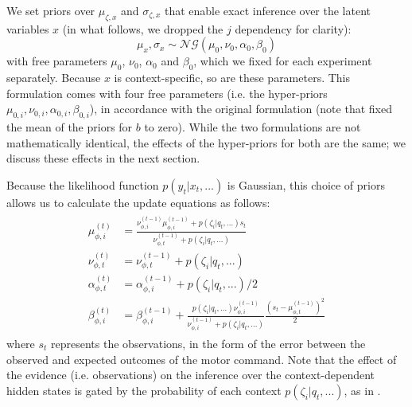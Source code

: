 \documentclass[a4paper,doc,floatsintext,natbib]{apa6}
\begin{document}
We set priors over $\mu_{\zeta,x}$ and $\sigma_{\zeta,x}$ that enable exact inference over the latent variables $x$ (in what follows, we dropped the $j$ dependency for clarity):
\begin{equation}
\mu_x, \sigma_x \sim \mathcal{NG}(\mu_0, \nu_0, \alpha_0, \beta_0)
\end{equation}
with free parameters $\mu_0$, $\nu_0$, $\alpha_0$ and $\beta_0$, which we fixed for each experiment separately. Because $x$ is context-specific, so are these parameters. This formulation comes with four free parameters (i.e. the hyper-priors $\mu_{0,i}, \nu_{0,i}, \alpha_{0,i}, \beta_{0,i}$), in accordance with the original formulation (note that \cite{Heald_Contextual_2021} fixed the mean of the priors for $b$ to zero). While the two formulations are not mathematically identical, the effects of the hyper-priors for both are the same; we discuss these effects in the next section.

Because the likelihood function $p(y_t | x_t, ...)$ is Gaussian, this choice of priors allows us to calculate the update equations as follows:
\begin{align}
  \begin{split}
  \mu_{\phi, i}^{(t)} &= \frac{\nu_{\phi,i}^{(t-1)} \mu_{\phi,i}^{(t-1)} + p(\zeta_i | q_t, ...)s_t}{\nu_{\phi,t}^{(t-1)} + p(\zeta_i | q_t, ...)} \\
  \nu_{\phi,t}^{(t)} &= \nu_{\phi,t}^{(t-1)} + p(\zeta_i | q_t, ...) \\
  \alpha_{\phi,t}^{(t)} &= \alpha_{\phi,i}^{(t-1)} + p(\zeta_i | q_t, ...) / 2 \\
  \beta_{\phi,i}^{(t)} &= \beta_{\phi,i}^{(t-1)} + \frac{p(\zeta_i | q_t, ...)\nu_{\phi,i}^{(t-1)}}{\nu_{\phi,i}^{(t-1)} +
    p(\zeta_i | q_t, ...)}\frac{\left(s_t - \mu_{\phi,t}^{(t-1)}\right)^2}{2}  \label{eqn:update-full}
  \end{split}
\end{align}
where $s_t$ represents the observations, in the form of the error between the observed and expected outcomes of the motor command. Note that the effect of the evidence (i.e. observations) on the inference over the context-dependent hidden states is gated by the probability of each context $p(\zeta_i | q_t, ...)$, as in \cite[][supplementary materials]{Heald_Contextual_2021}.
\end{document}
